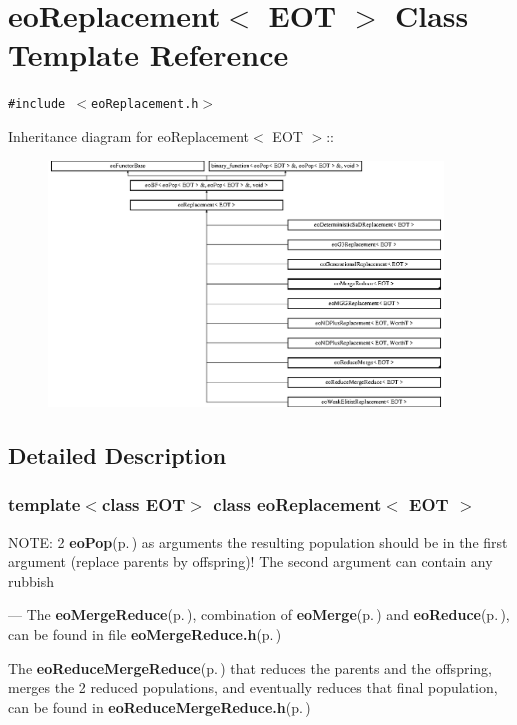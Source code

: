 \section{eo\-Replacement$<$ EOT $>$ Class Template Reference}
\label{classeo_replacement}
{\tt \#include $<$eo\-Replacement.h$>$}

Inheritance diagram for eo\-Replacement$<$ EOT $>$::\begin{figure}[H]
\begin{center}
\leavevmode
\includegraphics[height=6.5233cm]{classeo_replacement}
\end{center}
\end{figure}


\subsection{Detailed Description}
\subsubsection*{template$<$class EOT$>$ class eo\-Replacement$<$ EOT $>$}

NOTE: 2 {\bf eo\-Pop}{\rm (p.\,\pageref{classeo_pop})} as arguments the resulting population should be in the first argument (replace parents by offspring)! The second argument can contain any rubbish

--- The {\bf eo\-Merge\-Reduce}{\rm (p.\,\pageref{classeo_merge_reduce})}, combination of {\bf eo\-Merge}{\rm (p.\,\pageref{classeo_merge})} and {\bf eo\-Reduce}{\rm (p.\,\pageref{classeo_reduce})}, can be found in file {\bf eo\-Merge\-Reduce.h}{\rm (p.\,\pageref{eo_merge_reduce_8h})}

The {\bf eo\-Reduce\-Merge\-Reduce}{\rm (p.\,\pageref{classeo_reduce_merge_reduce})} that reduces the parents and the offspring, merges the 2 reduced populations, and eventually reduces that final population, can be found in {\bf eo\-Reduce\-Merge\-Reduce.h}{\rm (p.\,\pageref{eo_reduce_merge_reduce_8h})}

